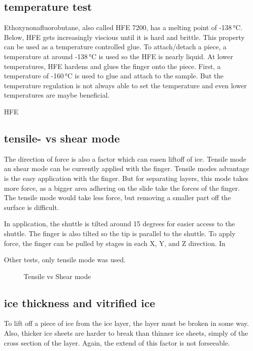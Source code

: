 \subsection{temperature test}

Ethoxynonafluorobutane, also called HFE 7200, has a melting point of -138\,°C. Below, HFE gets increasingly viscious until it is hard and brittle. This property can be used as a temperature controlled glue. To attach/detach a piece, a temperature at around -138\,°C is used so the HFE is nearly liquid. At lower temperatures, HFE hardens and glues the finger onto the piece. First, a temperature of -160\,°C is used to glue and attach to the sample. But the temperature regulation is not always able to set the temperature and even lower temperatures are maybe beneficial. 

HFE

\subsection{tensile- vs shear mode}

The direction of force is also a factor which can easen liftoff of ice. Tensile mode an shear mode can be currently applied with the finger. Tensile modes advantage is the easy application with the finger. But for separating layers, this mode takes more force, as a bigger area adhering on the slide take the forces of the finger. The tensile mode would take less force, but removing a smaller part off the surface is difficult.

In application, the shuttle is tilted around 15 degrees for easier access to the shuttle. The finger is also tilted so the tip is parallel to the shuttle. To apply force, the finger can be pulled by stages in each X, Y, and Z direction. In 

Other tests, only tensile mode was used.

\begin{figure}[hbt!]
	\centering
	
	\caption{Tensile vs Shear mode}
	\label{fig:tensilevsshear}
\end{figure}

\subsection{ice thickness and vitrified ice}

To lift off a piece of ice from the ice layer, the layer must be broken in some way. Also, thicker ice sheets are harder to break than thinner ice sheets, simply of the cross section of the layer. Again, the extend of this factor is not forseeable. 

